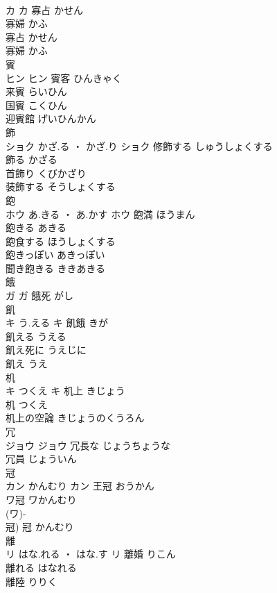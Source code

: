 \documentclass[8pt]{extreport}
\begin{document}
\begin{CJK}{UTF8}{min}
\\	カ		カ	寡占	かせん	
\\	寡婦	かふ	
\\	寡占	かせん	
\\	寡婦	かふ	
\\	賓	
\\	ヒン		ヒン	賓客	ひんきゃく	
\\	来賓	らいひん	
\\	国賓	こくひん	
\\	迎賓館	げいひんかん	
\\	飾	
\\	ショク	かざ.る ・ かざ.り	ショク	修飾する	しゅうしょくする	
\\	飾る	かざる	
\\	首飾り	くびかざり	
\\	装飾する	そうしょくする	
\\	飽	
\\	ホウ	あ.きる ・ あ.かす	ホウ	飽満	ほうまん	
\\	飽きる	あきる	
\\	飽食する	ほうしょくする	
\\	飽きっぽい	あきっぽい	
\\	聞き飽きる	ききあきる	
\\	餓	
\\	ガ		ガ													餓死	がし	
\\	飢	
\\	キ	う.える	キ	飢餓	きが	
\\	飢える	うえる	
\\	飢え死に	うえじに	
\\	飢え	うえ	
\\	机	
\\	キ	つくえ	キ	机上	きじょう	
\\	机	つくえ	
\\	机上の空論	きじょうのくうろん	
\\	冗	
\\	ジョウ		ジョウ													冗長な	じょうちょうな	
\\	冗員	じょういん	
\\	冠	
\\	カン	かんむり	カン	王冠	おうかん	
\\	ワ冠	ワかんむり	
\\	(ワ)-
\\	冠)	冠	かんむり	
\\	離	
\\	リ	はな.れる ・ はな.す	リ	離婚	りこん	
\\	離れる	はなれる	
\\	離陸	りりく	

\end{CJK}
\end{document}
